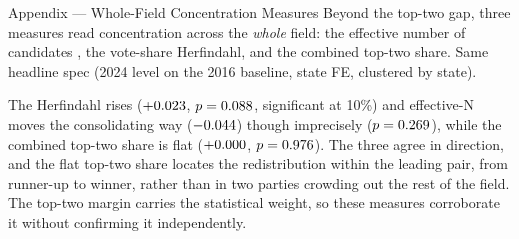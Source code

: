 
\begin{frame}{Appendix --- Whole-Field Concentration Measures}
\hypertarget{app:concentration}{}
\small
Beyond the top-two gap, three measures read concentration across the \emph{whole} field: the effective number of candidates , the vote-share Herfindahl, and the combined top-two share. Same headline spec (2024 level on the 2016 baseline, state FE, clustered by state).
\smallskip
\begin{center}
\scriptsize
\resizebox{\linewidth}{!}{}
\end{center}
\smallskip
\footnotesize The Herfindahl rises ($+0.023$, $p=0.088$, significant at 10\%) and effective-N moves the consolidating way ($-0.044$) though imprecisely ($p=0.269$), while the combined top-two share is flat ($+0.000$, $p=0.976$). The three agree in direction, and the flat top-two share locates the redistribution within the leading pair, from runner-up to winner, rather than in two parties crowding out the rest of the field. The top-two margin carries the statistical weight, so these measures corroborate it without confirming it independently. \hfill\hyperlink{src:spine1}{}
\end{frame}
